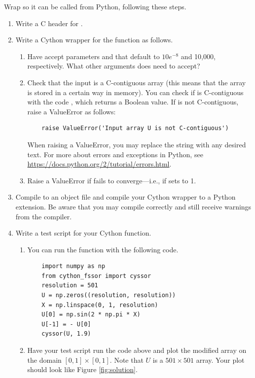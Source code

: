 \begin{problem}\label{prob:c_wrap}
Wrap  so it can be called from Python, following these steps.
\begin{enumerate}
\item Write a C header for .
\item Write a Cython wrapper  for the function  as follows.
    \begin{enumerate}
    \item Have  accept parameters  and  that default to $10e^{-8}$ and 10,000, respectively.
    What other arguments does  need to accept?
    \item Check that the input  is a C-contiguous array (this means that the array is stored in a certain way in memory).
    You can check if  is C-contiguous with the code , which returns a Boolean value.
    If  is not C-contiguous, raise a ValueError as follows:
    \begin{lstlisting}
    raise ValueError('Input array U is not C-contiguous')
    \end{lstlisting}
    When raising a ValueError, you may replace the string  with any desired text.
    For more about errors and exceptions in Python, see \url{https://docs.python.org/2/tutorial/errors.html}.
    \item Raise a ValueError if  fails to converge---i.e., if  sets  to 1.
    \end{enumerate}
\item Compile  to an object file and compile your Cython wrapper to a Python extension. 
Be aware that you may compile  correctly and still receive warnings from the compiler.
\item Write a test script for your Cython function.
    \begin{enumerate}
    \item You can run the function with the following code.
    \begin{lstlisting}
	import numpy as np
	from cython_fssor import cyssor
	resolution = 501
	U = np.zeros((resolution, resolution))
	X = np.linspace(0, 1, resolution)
	U[0] = np.sin(2 * np.pi * X)
	U[-1] = - U[0]
	cyssor(U, 1.9)
	\end{lstlisting}
    \item Have your test script run the code above and plot the modified array  on the domain $[0,1]\times[0, 1]$. 
    Note that $U$ is a $501\times 501$ array.
    Your plot should look like Figure \ref{fig:solution}.
    \end{enumerate}
\end{enumerate}


\end{problem}
